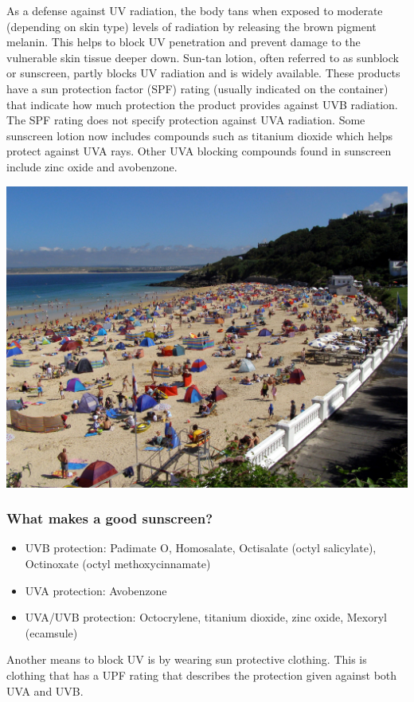 \label{m38779*id189495}As a defense against UV radiation, the body tans when exposed to moderate (depending on skin type) levels of radiation by releasing the brown pigment melanin. This helps to block UV penetration and prevent damage to the vulnerable skin tissue deeper down. Sun-tan lotion, often referred to as sunblock or sunscreen, partly blocks UV radiation and is widely available. These products have a sun protection factor (SPF) rating (usually indicated on the container) that indicate how much protection the product provides against UVB radiation. The SPF rating does not specify protection against UVA radiation. Some sunscreen lotion now includes compounds such as titanium dioxide which helps protect against UVA rays. Other UVA blocking compounds found in sunscreen include zinc oxide and avobenzone.\par 
\label{m38779*secfhsst!!!underscore!!!id701}
\begin{minipage}{.5\textwidth}
\includegraphics[width=.8\columnwidth]{photos/beach2_treehouse1977.jpg}
\end{minipage}
\begin{minipage}{.5\textwidth}
            \subsubsection*{What makes a good sunscreen? }
            \nopagebreak
        \label{m38779*id189518}\begin{itemize}[noitemsep]
            \label{m38779*uid18}\item UVB protection: Padimate O, Homosalate, Octisalate (octyl salicylate), Octinoxate (octyl methoxycinnamate)
\label{m38779*uid19}\item UVA protection: Avobenzone
\label{m38779*uid20}\item UVA/UVB protection: Octocrylene, titanium dioxide, zinc oxide, Mexoryl (ecamsule)
\end{itemize}
        \label{m38779*id189561}Another means to block UV is by wearing sun protective clothing. This is clothing that has a UPF rating that describes the protection given against both UVA and UVB. \par 
      \label{m38779*uid21}
\end{minipage}

